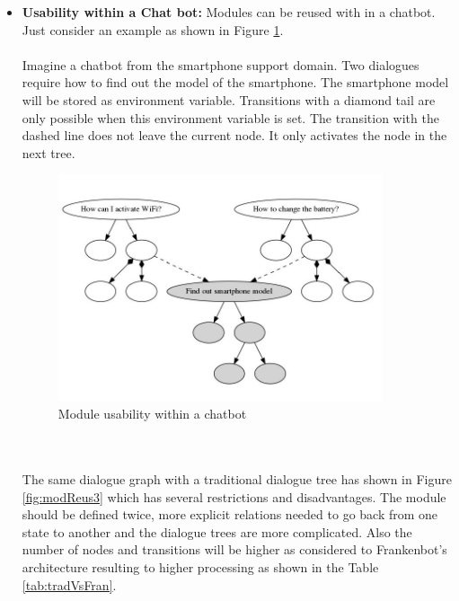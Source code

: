 \begin{itemize}
\item \textbf{Usability within a Chat bot:} Modules can be reused with in a chatbot. Just consider an example as shown in Figure \ref{fig:modReus2}. 
\\~\\
Imagine a chatbot from the smartphone support domain. Two dialogues require how to find out the model of the smartphone. The smartphone model will be stored as environment variable. Transitions with a diamond tail are only possible when this environment variable is set. The transition with the dashed line does not leave the current node. It only activates the node in the next tree.
\begin{figure}[!h]
    \centering
    \includegraphics[width=0.9\textwidth]{img/Module_Reusability_2.PNG}
    \caption{Module usability within a chatbot}
    \label{fig:modReus2}
\end{figure} 
\\~\\
The same dialogue graph with a traditional dialogue tree has shown in Figure \ref{fig:modReus3} which has several restrictions and disadvantages. The module should be defined twice, more explicit relations needed to go back from one state to another and the dialogue trees are more complicated. Also the number of nodes and transitions will be higher as considered to Frankenbot's architecture resulting to higher processing as shown in the Table \ref{tab:tradVsFran}.
\begin{figure}[!h]
    \centering

\end{figure}
\end{itemize}
